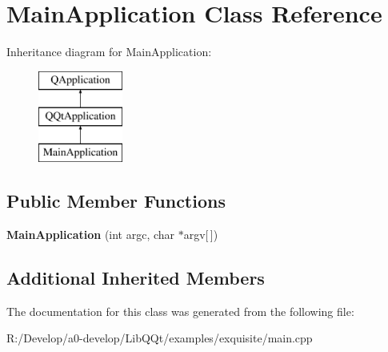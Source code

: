 \hypertarget{class_main_application}{}\section{Main\+Application Class Reference}
\label{class_main_application}
Inheritance diagram for Main\+Application\+:\begin{figure}[H]
\begin{center}
\leavevmode
\includegraphics[height=3.000000cm]{class_main_application}
\end{center}
\end{figure}
\subsection*{Public Member Functions}
\begin{DoxyCompactItemize}
\item 
\mbox{\label{class_main_application_a00ed2f42d92825b1ad6e49415a351098}} 
{\bfseries Main\+Application} (int argc, char $\ast$argv\mbox{[}$\,$\mbox{]})
\end{DoxyCompactItemize}
\subsection*{Additional Inherited Members}


The documentation for this class was generated from the following file\+:\begin{DoxyCompactItemize}
\item 
R\+:/\+Develop/a0-\/develop/\+Lib\+Q\+Qt/examples/exquisite/main.\+cpp\end{DoxyCompactItemize}

